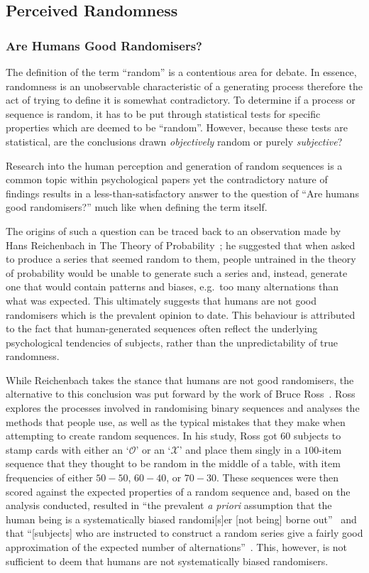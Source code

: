 \subsection{Perceived Randomness}\label{subsection:perceived_randomness}
\subsubsection{Are Humans Good Randomisers?}\label{subsubsection:are_humans_good_randomisers}
The definition of the term ``random'' is a contentious area for debate. In essence, randomness is an unobservable characteristic of a generating process therefore the act of trying to define it is somewhat contradictory. To determine if a process or sequence is random, it has to be put through statistical tests for specific properties which are deemed to be ``random''. However, because these tests are statistical, are the conclusions drawn \textit{objectively} random or purely \textit{subjective}?

Research into the human perception and generation of random sequences is a common topic within psychological papers yet the contradictory nature of findings results in a less-than-satisfactory answer to the question of ``Are humans good randomisers?'' \textendash{} much like when defining the term itself.

The origins of such a question can be traced back to an observation made by Hans Reichenbach in The Theory of Probability~\cite{reichenbach:1949}; he suggested that when asked to produce a series that seemed random to them, people untrained in the theory of probability would be unable to generate such a series and, instead, generate one that would contain patterns and biases, e.g.\ too many alternations than what was expected. This ultimately suggests that humans are not good randomisers which is the prevalent opinion to date. This behaviour is attributed to the fact that human-generated sequences often reflect the underlying psychological tendencies of subjects, rather than the unpredictability of true randomness.

While Reichenbach takes the stance that humans are not good randomisers, the alternative to this conclusion was put forward by the work of Bruce Ross~\cite{ross:1955}. Ross explores the processes involved in randomising binary sequences and analyses the methods that people use, as well as the typical mistakes that they make when attempting to create random sequences. In his study, Ross got 60 subjects to stamp cards with either an `$\mathcal{O}$' or an `$\mathcal{X}$' and place them singly in a $100$-item sequence that they thought to be random in the middle of a table, with item frequencies of either $50-50$, $60-40$, or $70-30$. These sequences were then scored against the expected properties of a random sequence and, based on the analysis conducted, resulted in ``the prevalent \textit{a priori} assumption that the human being is a systematically biased randomi[s]er [not being] borne out''~\cite{ross:1955} and that ``[subjects] who are instructed to construct a random series give a fairly good approximation of the expected number of alternations''~\cite{bakan:1960}. This, however, is not sufficient to deem that humans are not systematically biased randomisers.

